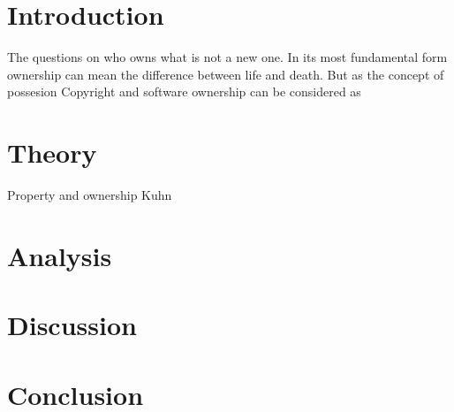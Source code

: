 \documentclass{article}
\begin{document}
\section{Introduction}
The questions on who owns what is not a new one.
In its most fundamental form ownership can mean the
difference between life and death. But as the concept
of possesion 
Copyright and software ownership can be considered as 

\section{Theory}
Property and ownership
Kuhn

\section{Analysis}

\section{Discussion}

\section{Conclusion}
\end{document}
